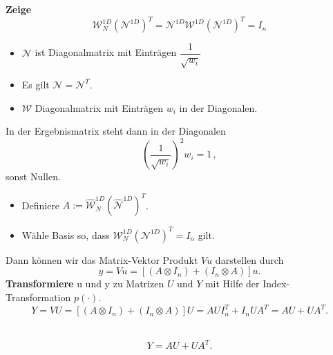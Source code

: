 \begin{frame}
\begin{framed}
\textbf{Zeige} 
\begin{equation*}
\mathcal{W}_N^{1D} (\mathcal{N}^{1D})^T = \mathcal{N}^{1D} \mathcal{W}^{1D} (\mathcal{N}^{1D})^T = I_n
\end{equation*}
\end{framed}
\begin{itemize}
\item $\mathcal{N}$ ist Diagonalmatrix mit Einträgen $\dfrac{1}{ \sqrt{w_i} }$
\item Es gilt $\mathcal{N}=\mathcal{N}^T$. 
\item $\mathcal{W}$ Diagonalmatrix mit Einträgen $w_i$ in der Diagonalen.
\end{itemize}
In der Ergebnismatrix steht dann in der Diagonalen 
\begin{equation*}
(\dfrac{1}{ \sqrt{w_i} })^2  w_i = 1 \, ,
\end{equation*}
sonst Nullen.
\end{frame}

\begin{frame}
\begin{itemize}
\item Definiere $A:=\widehat{\mathcal{W}}_N^{1D} (\widehat{\mathcal{N}}^{1D})^T$.
\item Wähle Basis so, dass $\mathcal{W}_N^{1D} (\mathcal{N}^{1D})^T  = I_n$ gilt.
\end{itemize}
Dann können wir das Matrix-Vektor Produkt $Vu$ darstellen durch
\begin{equation*} \label{eq:easy}
y=Vu =[(A \otimes I_n) + (I_n \otimes A)]u.
\end{equation*}
\pause
\textbf{Transformiere} u und y zu Matrizen $U$ und $Y$ mit Hilfe der Index-Transformation $p(\cdot)$.
\begin{equation*} \label{eq:easy}
Y=VU =[(A \otimes I_n) + (I_n \otimes A)]U=AUI_n^T + I_nUA^T=AU+UA^T.
\end{equation*}
\pause
\begin{framed}
 \\
\begin{equation*}
Y=AU+UA^T.
\end{equation*}
\end{framed}
\end{frame}

